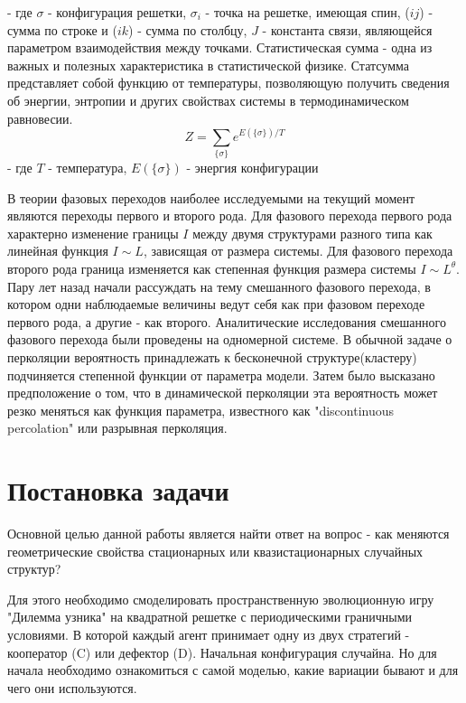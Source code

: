 \documentclass[12pt,a4paper]{article}
\begin{document}
	- где $\sigma$ - конфигурация решетки, $\sigma_{i}$ - точка на решетке, имеющая спин, ($ij$) - сумма по строке и ($ik$) - сумма по столбцу, $J$ - константа связи, являющейся параметром взаимодействия между точками. Статистическая сумма - одна из важных и полезных характеристика в статистической физике. Статсумма представляет собой функцию от температуры, позволяющую получить сведения об энергии, энтропии и других свойствах системы в термодинамическом равновесии. 
	\begin{equation}\label{statsum}
		Z = \sum_{\{\sigma\}}e^{E(\{\sigma\})/T}
	\end{equation}
	- где $T$ - температура, $E(\{\sigma\})$ - энергия конфигурации
	
	\par В теории фазовых переходов\cite{phase_trans} наиболее исследуемыми на текущий момент являются переходы первого и второго рода. Для фазового перехода первого рода характерно изменение границы $I$ между двумя структурами разного типа как линейная функция $I \sim L$\cite{first_order}, зависящая от размера системы. Для фазового перехода второго рода граница изменяется как степенная функция размера системы $I \sim L^{\theta}$\cite{finite_size}. Пару лет назад начали рассуждать на тему смешанного фазового перехода, в котором одни наблюдаемые величины ведут себя как при фазовом переходе первого рода, а другие - как второго. Аналитические исследования смешанного фазового перехода были проведены на одномерной системе\cite{mixed_order}. В обычной задаче о перколяции вероятность принадлежать к бесконечной структуре(кластеру)	подчиняется степенной функции от параметра модели. Затем было высказано предположение о том, что в динамической перколяции эта вероятность может резко меняться как функция параметра\cite{boostrap}, известного как "discontinuous percolation"\cite{discont_perc} или разрывная перколяция. 
	
	\section{Постановка задачи}
	
	\par Основной целью данной работы является найти ответ на вопрос - как меняются геометрические свойства стационарных или квазистационарных случайных структур?
	
	\par Для этого необходимо смоделировать пространственную эволюционную игру "Дилемма узника" на квадратной решетке с периодическими граничными условиями. В которой каждый агент принимает одну из двух стратегий - кооператор (C) или дефектор (D). Начальная конфигурация случайна. Но для начала необходимо ознакомиться с самой моделью, какие вариации бывают и для чего они используются.
	
\end{document}

